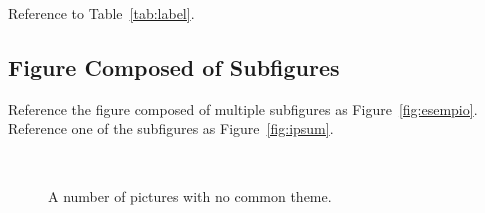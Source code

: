 \documentclass[
10pt, %
a4paper, %
oneside, %
headinclude,footinclude, %
BCOR5mm, %
]{scrartcl}
\begin{document}
Reference to Table~\vref{tab:label}. %


\subsection{Figure Composed of Subfigures}

Reference the figure composed of multiple subfigures as Figure~\vref{fig:esempio}. Reference one of the subfigures as Figure~\vref{fig:ipsum}. %

\lipsum[15-18] %

\begin{figure}[tb]
\centering
{} \quad
{} \\
 \quad
{}
\caption[A number of pictures.]{A number of pictures with no common theme.} %
\label{fig:esempio}
\end{figure}


\renewcommand{\refname}{\spacedlowsmallcaps{References}} %




\end{document}

